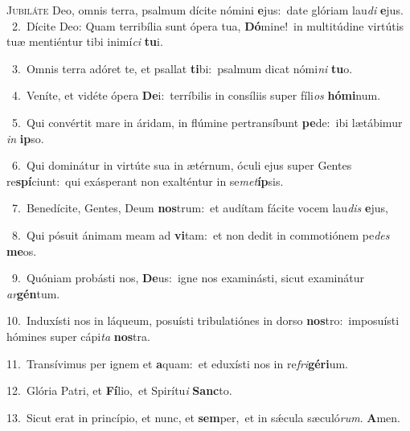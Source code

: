 \lettrine{\initial\textcolor{\initialcolor}{J}}{ubiláte} Deo, omnis terra, psalmum dícite nómini \textbf{e}\-jus:~\star date glóriam lau\textit{di} \textbf{e}\-jus.\\
{\numbfont\textcolor{\numbcolor}{~2.}}~Dícite Deo: Quam terribília sunt ópera tua, \textbf{Dó}\-mine!~\star in multitúdine virtútis tuæ mentiéntur tibi inimí\textit{ci} \textbf{tu}\-i.\par
{\numbfont\textcolor{\numbcolor}{~3.}}~Omnis terra adóret te, et psallat \textbf{ti}\-bi:~\star psalmum dicat nómi\textit{ni} \textbf{tu}\-o.\par
{\numbfont\textcolor{\numbcolor}{~4.}}~Veníte, et vidéte ópera \textbf{De}\-i:~\star terríbilis in consíliis super fíli\textit{os} \textbf{hó}\-\textbf{mi}num.\par
{\numbfont\textcolor{\numbcolor}{~5.}}~Qui convértit mare in áridam, in flúmine pertransíbunt \textbf{pe}\-de:~\star ibi lætábimur \textit{in} \textbf{ip}\-so.\par
{\numbfont\textcolor{\numbcolor}{~6.}}~Qui dominátur in virtúte sua in ætérnum, óculi ejus super Gentes re\-\textbf{spí}\-ciunt:~\star qui exásperant non exalténtur in se\-\textit{met}\-\textbf{íp}sis.\par
{\numbfont\textcolor{\numbcolor}{~7.}}~Benedícite, Gentes, Deum \textbf{nos}\-trum:~\star et audítam fácite vocem lau\textit{dis} \textbf{e}\-jus,\par
{\numbfont\textcolor{\numbcolor}{~8.}}~Qui pósuit ánimam meam ad \textbf{vi}\-tam:~\star et non dedit in commotiónem pe\textit{des} \textbf{me}\-os.\par
{\numbfont\textcolor{\numbcolor}{~9.}}~Quóniam probásti nos, \textbf{De}\-us:~\star igne nos examinásti, sicut examinátur \textit{ar}\-\textbf{gén}tum.\par
{\numbfont\textcolor{\numbcolor}{10.}}~Induxísti nos in láqueum, posuísti tribulatiónes in dorso \textbf{nos}\-tro:~\star imposuísti hómines super cápi\textit{ta} \textbf{nos}\-tra.\par
{\numbfont\textcolor{\numbcolor}{11.}}~Transívimus per ignem et \textbf{a}\-quam:~\star et eduxísti nos in re\-\textit{fri}\-\textbf{gé}\textbf{ri}um.\par
{\numbfont\textcolor{\numbcolor}{12.}}~Glória Patri, et \textbf{Fí}\-lio,~\star et Spirítu\textit{i} \textbf{Sanc}\-to.\par
{\numbfont\textcolor{\numbcolor}{13.}}~Sicut erat in princípio, et nunc, et \textbf{sem}\-per,~\star et in sǽcula sæculó\-\textit{rum}\-. \textbf{A}\-men.\par
